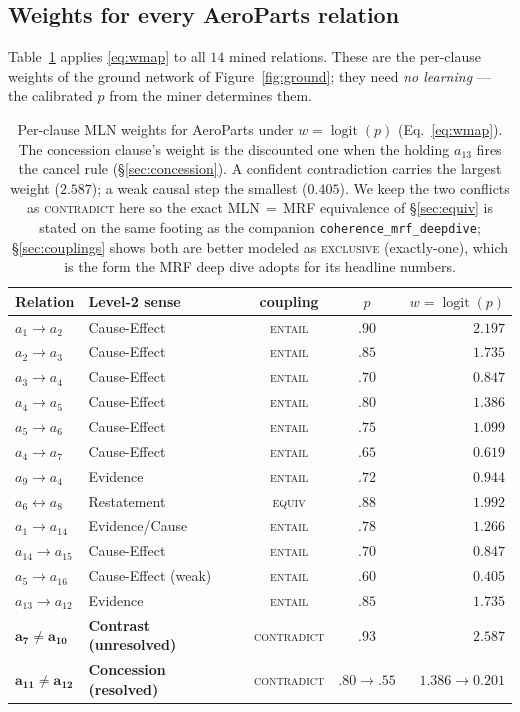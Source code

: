 \documentclass[11pt]{article}
\newcommand{\Ent}{\textsc{entail}}
\newcommand{\Con}{\textsc{contradict}}
\newcommand{\Equ}{\textsc{equiv}}
\begin{document}
\subsection{Weights for every AeroParts relation}
Table~\ref{tab:weights} applies \eqref{eq:wmap} to all $14$ mined relations. These are the
per-clause weights of the ground network of Figure~\ref{fig:ground}; they need \emph{no
learning} --- the calibrated $p$ from the miner determines them.

\begin{table}[h]\centering\small
\renewcommand{\arraystretch}{1.12}
\begin{tabular}{@{}llccr@{}}
\toprule
\textbf{Relation} & \textbf{Level-2 sense} & \textbf{coupling} & \textbf{$p$} & \textbf{$w=\operatorname{logit}(p)$}\\
\midrule
$a_1\!\to\!a_2$      & Cause-Effect       & \Ent{} & $.90$ & $2.197$\\
$a_2\!\to\!a_3$      & Cause-Effect       & \Ent{} & $.85$ & $1.735$\\
$a_3\!\to\!a_4$      & Cause-Effect       & \Ent{} & $.70$ & $0.847$\\
$a_4\!\to\!a_5$      & Cause-Effect       & \Ent{} & $.80$ & $1.386$\\
$a_5\!\to\!a_6$      & Cause-Effect       & \Ent{} & $.75$ & $1.099$\\
$a_4\!\to\!a_7$      & Cause-Effect       & \Ent{} & $.65$ & $0.619$\\
$a_9\!\to\!a_4$      & Evidence           & \Ent{} & $.72$ & $0.944$\\
$a_6\!\leftrightarrow\!a_8$ & Restatement & \Equ{} & $.88$ & $1.992$\\
$a_1\!\to\!a_{14}$   & Evidence/Cause     & \Ent{} & $.78$ & $1.266$\\
$a_{14}\!\to\!a_{15}$& Cause-Effect       & \Ent{} & $.70$ & $0.847$\\
$a_5\!\to\!a_{16}$   & Cause-Effect (weak)& \Ent{} & $.60$ & $0.405$\\
$a_{13}\!\to\!a_{12}$& Evidence           & \Ent{} & $.85$ & $1.735$\\
$\mathbf{a_7\!\neq\!a_{10}}$ & \textbf{Contrast (unresolved)} & \Con{} & $\mathbf{.93}$ & $\mathbf{2.587}$\\
$\mathbf{a_{11}\!\neq\!a_{12}}$ & \textbf{Concession (resolved)} & \Con{} & $.80\!\to\!.55$ & $1.386\!\to\!0.201$\\
\bottomrule
\end{tabular}
\caption{Per-clause MLN weights for AeroParts under $w=\operatorname{logit}(p)$
(Eq.~\ref{eq:wmap}). The concession clause's weight is the discounted one when the holding
$a_{13}$ fires the cancel rule (\S\ref{sec:concession}). A confident contradiction carries
the largest weight ($2.587$); a weak causal step the smallest ($0.405$). We keep the two
conflicts as \Con{} here so the exact MLN\,$=$\,MRF equivalence of \S\ref{sec:equiv} is stated
on the same footing as the companion \texttt{coherence\_mrf\_deepdive}; \S\ref{sec:couplings}
shows both are better modeled as \textsc{exclusive} (exactly-one), which is the form the MRF
deep dive adopts for its headline numbers.}
\label{tab:weights}
\end{table}
\end{document}
